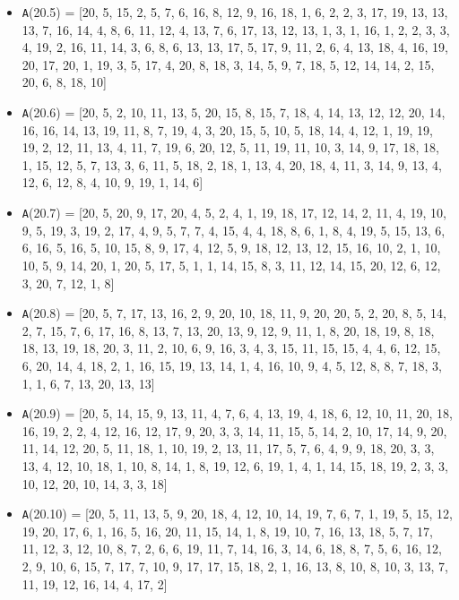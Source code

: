 \documentclass[runningheads, a4paper]{llncs}
\begin{document}
\begin{itemize}
	\item {\texttt A(20.5) = } [20, 5, 15, 2, 5, 7, 6, 16, 8, 12, 9, 16, 18, 1, 6, 2, 2, 3, 17, 19, 13, 13, 13, 7, 16, 14, 4, 8, 6, 11, 12, 4, 13, 7, 6, 17, 13, 12, 13, 1, 3, 1, 16, 1, 2, 2, 3, 3, 4, 19, 2, 16, 11, 14, 3, 6, 8, 6, 13, 13, 17, 5, 17, 9, 11, 2, 6, 4, 13, 18, 4, 16, 19, 20, 17, 20, 1, 19, 3, 5, 17, 4, 20, 8, 18, 3, 14, 5, 9, 7, 18, 5, 12, 14, 14, 2, 15, 20, 6, 8, 18, 10]
	
	\item {\texttt A(20.6) = } [20, 5, 2, 10, 11, 13, 5, 20, 15, 8, 15, 7, 18, 4, 14, 13, 12, 12, 20, 14, 16, 16, 14, 13, 19, 11, 8, 7, 19, 4, 3, 20, 15, 5, 10, 5, 18, 14, 4, 12, 1, 19, 19, 19, 2, 12, 11, 13, 4, 11, 7, 19, 6, 20, 12, 5, 11, 19, 11, 10, 3, 14, 9, 17, 18, 18, 1, 15, 12, 5, 7, 13, 3, 6, 11, 5, 18, 2, 18, 1, 13, 4, 20, 18, 4, 11, 3, 14, 9, 13, 4, 12, 6, 12, 8, 4, 10, 9, 19, 1, 14, 6]
	
	\item {\texttt A(20.7) = } [20, 5, 20, 9, 17, 20, 4, 5, 2, 4, 1, 19, 18, 17, 12, 14, 2, 11, 4, 19, 10, 9, 5, 19, 3, 19, 2, 17, 4, 9, 5, 7, 7, 4, 15, 4, 4, 18, 8, 6, 1, 8, 4, 19, 5, 15, 13, 6, 6, 16, 5, 16, 5, 10, 15, 8, 9, 17, 4, 12, 5, 9, 18, 12, 13, 12, 15, 16, 10, 2, 1, 10, 10, 5, 9, 14, 20, 1, 20, 5, 17, 5, 1, 1, 14, 15, 8, 3, 11, 12, 14, 15, 20, 12, 6, 12, 3, 20, 7, 12, 1, 8]
	
	\item {\texttt A(20.8) = } [20, 5, 7, 17, 13, 16, 2, 9, 20, 10, 18, 11, 9, 20, 20, 5, 2, 20, 8, 5, 14, 2, 7, 15, 7, 6, 17, 16, 8, 13, 7, 13, 20, 13, 9, 12, 9, 11, 1, 8, 20, 18, 19, 8, 18, 18, 13, 19, 18, 20, 3, 11, 2, 10, 6, 9, 16, 3, 4, 3, 15, 11, 15, 15, 4, 4, 6, 12, 15, 6, 20, 14, 4, 18, 2, 1, 16, 15, 19, 13, 14, 1, 4, 16, 10, 9, 4, 5, 12, 8, 8, 7, 18, 3, 1, 1, 6, 7, 13, 20, 13, 13]
	
	\item {\texttt A(20.9) = } [20, 5, 14, 15, 9, 13, 11, 4, 7, 6, 4, 13, 19, 4, 18, 6, 12, 10, 11, 20, 18, 16, 19, 2, 2, 4, 12, 16, 12, 17, 9, 20, 3, 3, 14, 11, 15, 5, 14, 2, 10, 17, 14, 9, 20, 11, 14, 12, 20, 5, 11, 18, 1, 10, 19, 2, 13, 11, 17, 5, 7, 6, 4, 9, 9, 18, 20, 3, 3, 13, 4, 12, 10, 18, 1, 10, 8, 14, 1, 8, 19, 12, 6, 19, 1, 4, 1, 14, 15, 18, 19, 2, 3, 3, 10, 12, 20, 10, 14, 3, 3, 18]
	
	\item {\texttt A(20.10) = } [20, 5, 11, 13, 5, 9, 20, 18, 4, 12, 10, 14, 19, 7, 6, 7, 1, 19, 5, 15, 12, 19, 20, 17, 6, 1, 16, 5, 16, 20, 11, 15, 14, 1, 8, 19, 10, 7, 16, 13, 18, 5, 7, 17, 11, 12, 3, 12, 10, 8, 7, 2, 6, 6, 19, 11, 7, 14, 16, 3, 14, 6, 18, 8, 7, 5, 6, 16, 12, 2, 9, 10, 6, 15, 7, 17, 7, 10, 9, 17, 17, 15, 18, 2, 1, 16, 13, 8, 10, 8, 10, 3, 13, 7, 11, 19, 12, 16, 14, 4, 17, 2]
\end{itemize}
\end{document}
